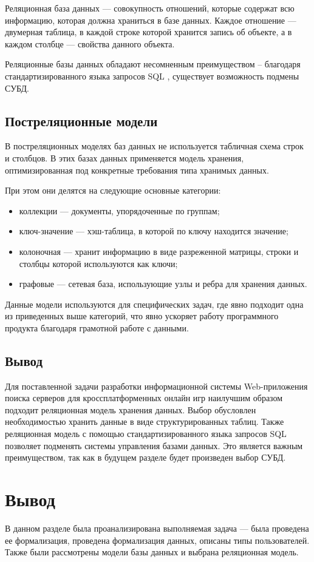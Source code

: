 Реляционная база данных \cite{db-sql} --- совокупность отношений, которые содержат всю информацию, которая должна храниться в базе данных. Каждое отношение --- двумерная таблица, в каждой строке которой хранится запись об объекте, а в каждом столбце --- свойства данного объекта.

Реляционные базы данных обладают несомненным преимуществом -- благодаря стандартизированного языка запросов SQL \cite{sql}, существует возможность подмены СУБД.


\subsection{Постреляционные модели}

В постреляционных моделях баз данных \cite{db-nosql} не используется табличная схема строк и столбцов. В этих базах данных применяется модель хранения, оптимизированная под конкретные требования типа хранимых данных.

При этом они делятся на следующие основные категории:

\begin{itemize}
    \item коллекции --- документы, упорядоченные по группам;
    \item ключ-значение --- хэш-таблица, в которой по ключу находится значение;
    \item колоночная --- хранит информацию в виде разреженной матрицы, строки и столбцы которой используются как ключи;
    \item графовые --- сетевая база, использующие узлы и ребра для хранения данных.
\end{itemize}

Данные модели используются для специфических задач, где явно подходит одна из приведенных выше категорий, что явно ускоряет работу программного продукта благодаря грамотной работе с данными.


\subsection{Вывод}

Для поставленной задачи разработки информационной системы Web-приложения поиска серверов для кроссплатформенных онлайн игр наилучшим образом подходит реляционная модель хранения данных. Выбор обусловлен необходимостью хранить данные в виде структурированных таблиц. Также реляционная модель с помощью стандартизированного языка запросов SQL позволяет подменять системы управления базами данных. Это является важным преимуществом, так как в будущем разделе будет произведен выбор СУБД.


\section*{Вывод}

В данном разделе была проанализирована выполняемая задача --- была проведена ее формализация, проведена формализация данных, описаны типы пользователей. Также были рассмотрены модели базы данных и выбрана реляционная модель.

